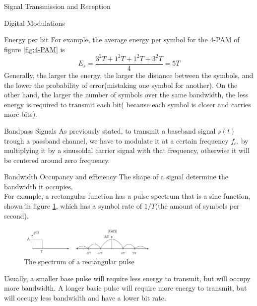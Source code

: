 \begin{section}{Signal Transmission and Reception}
\begin{subsection}{Digital Modulations}
\begin{subsubsection}{Energy per bit}
      For example, the average energy per symbol for the 4-PAM of figure \ref{fig:4-PAM} is
      \begin{equation}
        E_s=\frac{3^2T+1^2T+1^2T+3^2T}{4}=5T
      \end{equation}
      Generally, the larger the energy, the larger the distance between the symbols, and the lower
      the probability of error(mistaking one symbol for another). On the other hand, the larger the
      number of symbols over the same bandwidth, the less energy is required to transmit each bit(
      because each symbol is closer and carries more bits).\\
    \end{subsubsection}

    \begin{subsubsection}{Bandpass Signals}
      As previously stated, to transmit a baseband signal $s(t)$ trough a passband channel, we 
      have to modulate it at a certain frequency $f_c$, by multiplying it by a sinusoidal carrier
      signal with that frequency, otherwise it will be centered around zero frequency.\\
    \end{subsubsection}

    \begin{subsubsection}{Bandwidth Occupancy and efficiency}
      The shape of a signal determine the bandwidth it occupies.\\
      For example, a rectangular function has a pulse spectrum that is a sinc function, shown in
      figure \ref{fig:rectangular pulse spectrum}, which has a symbol rate of $1/T$(the amount of 
      symbols per second).

      \begin{figure}[h]
        \centering
        \includegraphics[width=0.6\textwidth]{img/wireless/rectangular pulse spectrum.png}
        \caption{The spectrum of a rectangular pulse}
        \label{fig:rectangular pulse spectrum}
      \end{figure}

      Usually, a smaller base pulse will require less energy to transmit, but will occupy more
      bandwidth. A longer basic pulse will require more energy to transmit, but will occupy less
      bandwidth and have a lower bit rate.\\


\end{subsubsection}
\end{subsection}
\end{section}
